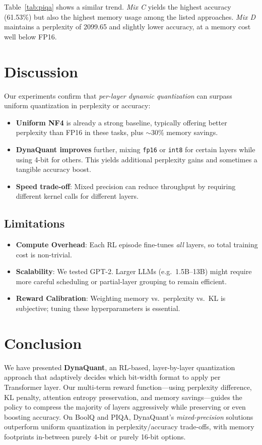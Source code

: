 \documentclass{article}
\begin{document}
	Table~\ref{tab:piqa} shows a similar trend. \emph{Mix C} yields the highest accuracy (61.53\%) but also the highest memory usage among the listed approaches. \emph{Mix D} maintains a perplexity of 2099.65 and slightly lower accuracy, at a memory cost well below FP16. 
	
	\section{Discussion}
	\label{sec:discussion}
	Our experiments confirm that \emph{per-layer dynamic quantization} can surpass uniform quantization in perplexity or accuracy:
	\begin{itemize}
		\item \textbf{Uniform NF4} is already a strong baseline, typically offering better perplexity than FP16 in these tasks, plus $\sim$30\% memory savings.
		\item \textbf{DynaQuant improves} further, mixing \texttt{fp16} or \texttt{int8} for certain layers while using 4-bit for others. This yields additional perplexity gains and sometimes a tangible accuracy boost.
		\item \textbf{Speed trade-off}: Mixed precision can reduce throughput by requiring different kernel calls for different layers. 
	\end{itemize}
	
	\subsection{Limitations}
	\begin{itemize}
		\item \textbf{Compute Overhead}: Each RL episode fine-tunes \emph{all} layers, so total training cost is non-trivial.
		\item \textbf{Scalability}: We tested GPT-2. Larger LLMs (e.g.\ 1.5B–13B) might require more careful scheduling or partial-layer grouping to remain efficient.
		\item \textbf{Reward Calibration}: Weighting memory vs.\ perplexity vs.\ KL is subjective; tuning these hyperparameters is essential.
	\end{itemize}
	
	\section{Conclusion}
	We have presented \textbf{DynaQuant}, an RL-based, layer-by-layer quantization approach that adaptively decides which bit-width format to apply per Transformer layer. Our multi-term reward function---using perplexity difference, KL penalty, attention entropy preservation, and memory savings---guides the policy to compress the majority of layers aggressively while preserving or even boosting accuracy. On BoolQ and PIQA, DynaQuant’s \emph{mixed-precision} solutions outperform uniform quantization in perplexity/accuracy trade-offs, with memory footprints in-between purely 4-bit or purely 16-bit options.  
	
\end{document}
